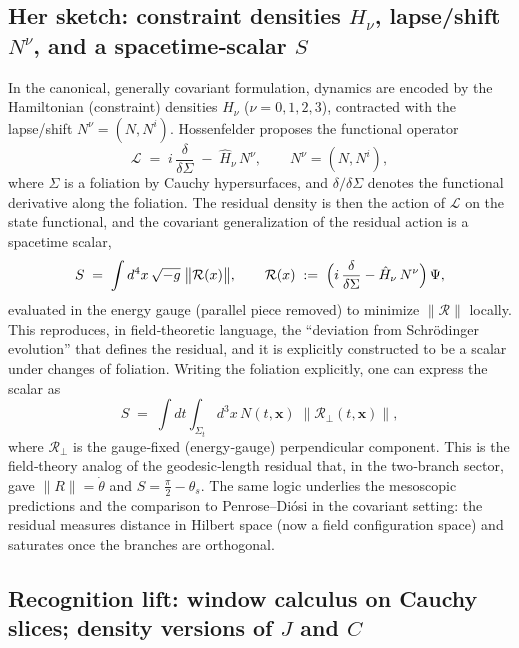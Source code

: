 \documentclass[11pt,letterpaper]{article}
\theoremstyle{definition}
\begin{document}
\subsection{Her sketch: constraint densities \(H_{\nu}\), lapse/shift \(N^{\nu}\), and a spacetime‑scalar \(S\)}

In the canonical, generally covariant formulation, dynamics are encoded by the Hamiltonian (constraint) densities \(H_{\nu}\) (\(\nu=0,1,2,3\)), contracted with the lapse/shift \(N^{\nu}=(N,N^{i})\). Hossenfelder proposes the functional operator
\begin{equation}
\mathcal L \;=\; i\,\frac{\delta}{\delta\Sigma}\;-\;\hat H_{\nu}\,N^{\nu},
\qquad
N^{\nu}=(N, N^{i}),
\end{equation}
where \(\Sigma\) is a foliation by Cauchy hypersurfaces, and \(\delta/\delta\Sigma\) denotes the functional derivative along the foliation. The residual density is then the action of \(\mathcal L\) on the state functional, and the covariant generalization of the residual action is a spacetime scalar,
\begin{equation}
S \;=\; \int d^4x\,\sqrt{-g}\;\bigl\|\mathcal R(x)\bigr\|,
\qquad
\mathcal R(x)\;:=\;\Bigl(i\,\frac{\delta}{\delta\Sigma}-\hat H_{\nu}\,N^{\nu}\Bigr)\,\Psi,
\end{equation}
evaluated in the energy gauge (parallel piece removed) to minimize \(\|\mathcal R\|\) locally. This reproduces, in field‑theoretic language, the ``deviation from Schrödinger evolution'' that defines the residual, and it is explicitly constructed to be a scalar under changes of foliation.
Writing the foliation explicitly, one can express the scalar as
\begin{equation}
S \;=\; \int dt \int_{\Sigma_t} d^3x\,N(t,\mathbf x)\;\bigl\|\mathcal R_{\perp}(t,\mathbf x)\bigr\|,
\end{equation}
where \(\mathcal R_{\perp}\) is the gauge‑fixed (energy‑gauge) perpendicular component. This is the field‑theory analog of the geodesic‑length residual that, in the two‑branch sector, gave \(\|R\|=\dot\theta\) and \(S=\tfrac{\pi}{2}-\theta_s\). The same logic underlies the mesoscopic predictions and the comparison to Penrose–Diósi in the covariant setting: the residual measures distance in Hilbert space (now a field configuration space) and saturates once the branches are orthogonal.
\subsection{Recognition lift: window calculus on Cauchy slices; density versions of \(J\) and \(C\)}
\end{document}
